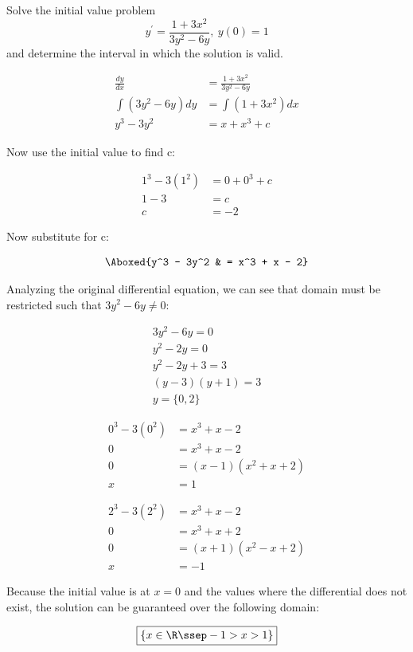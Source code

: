 \documentclass{lapchomework}
\begin{document}
\begin{problems}

\problem [17] Solve the initial value problem $$y^{\prime}=\frac{1+3x^2}
{3y^2-6y},\:y(0)=1$$ and determine the interval in which the solution is valid.

\begin{solution}

\step \begin{align*}
\frac{dy}{dx} & = \frac{1+3x^2}{3y^2-6y} \\
\int (3y^2 - 6y) dy & = \int (1+3x^2) dx \\
y^3 - 3y^2 & = x + x^3 + c
\end{align*}

\step Now use the initial value to find c:

\step \begin{align*}
1^3 - 3(1^2) & = 0 + 0^3 + c \\
1 - 3 & = c \\
c & = -2
\end{align*}

\step Now substitute for c:

\step \begin{align*}
\Aboxed{y^3 - 3y^2 & = x^3 + x - 2}
\end{align*}

\step Analyzing the original differential equation, we can see that domain must 
be restricted such that $3y^2 - 6y \neq 0$:

\step \begin{align*}
3y^2 - 6y = 0 \\
y^2 - 2y = 0 \\
y^2 - 2y + 3 = 3 \\
(y-3)(y+1) = 3 \\
y = \{0,2\}
\end{align*}

\step \begin{align*}
0^3 - 3(0^2) & = x^3 + x - 2 \\
0 & = x^3 + x - 2 \\
0 & = (x-1)(x^2 + x + 2) \\
x & = 1
\end{align*}

\step \begin{align*}
2^3 - 3(2^2) & = x^3 + x - 2 \\
0 & = x^3 + x + 2 \\
0 & = (x+1)(x^2 - x + 2) \\
x & = -1 
\end{align*}

\step Because the initial value is at $x=0$ and the values where the 
differential does not exist, the solution can be guaranteed over the following 
domain:

\step \begin{gather*}
\boxed{\{x \in \R \ssep -1 > x > 1\}}
\end{gather*}

\end{solution}

\end{problems}
\end{document}
